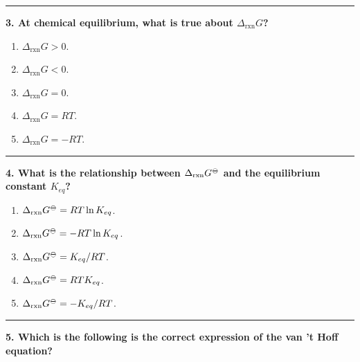 \documentclass[
  9pt,
]{extbook}
\providecommand{\tightlist}{%
  \setlength{\itemsep}{0pt}\setlength{\parskip}{0pt}}
\theoremstyle{definition}
\theoremstyle{definition}
\theoremstyle{definition}
\theoremstyle{definition}
\theoremstyle{remark}
\begin{document}
\begin{center}\rule{0.5\linewidth}{0.5pt}\end{center}

\textbf{3. At chemical equilibrium, what is true about \(\Delta_{\text{rxn}}G\)?}

\begin{enumerate}
\def\labelenumi{\alph{enumi}.}
\tightlist
\item
  \(\Delta_{\text{rxn}}G > 0\).
\item
  \(\Delta_{\text{rxn}}G < 0\).
\item
  \(\Delta_{\text{rxn}}G = 0\).
\item
  \(\Delta_{\text{rxn}}G = RT\).
\item
  \(\Delta_{\text{rxn}}G = -RT\).
\end{enumerate}

\begin{center}\rule{0.5\linewidth}{0.5pt}\end{center}

\textbf{4. What is the relationship between \(\Delta_{\text{rxn}}G^{{-\kern-6pt{\ominus}\kern-6pt-}}\) and the equilibrium constant \(K_{eq}\)?}

\begin{enumerate}
\def\labelenumi{\alph{enumi}.}
\tightlist
\item
  \(\Delta_{\text{rxn}}G^{{-\kern-6pt{\ominus}\kern-6pt-}} = RT\ln K_{eq}\).
\item
  \(\Delta_{\text{rxn}}G^{{-\kern-6pt{\ominus}\kern-6pt-}} = -RT\ln K_{eq}\).
\item
  \(\Delta_{\text{rxn}}G^{{-\kern-6pt{\ominus}\kern-6pt-}} = K_{eq}/RT\).
\item
  \(\Delta_{\text{rxn}}G^{{-\kern-6pt{\ominus}\kern-6pt-}} = RTK_{eq}\).
\item
  \(\Delta_{\text{rxn}}G^{{-\kern-6pt{\ominus}\kern-6pt-}} = -K_{eq}/RT\).
\end{enumerate}

\begin{center}\rule{0.5\linewidth}{0.5pt}\end{center}

\textbf{5. Which is the following is the correct expression of the van 't Hoff equation?}
\end{document}
